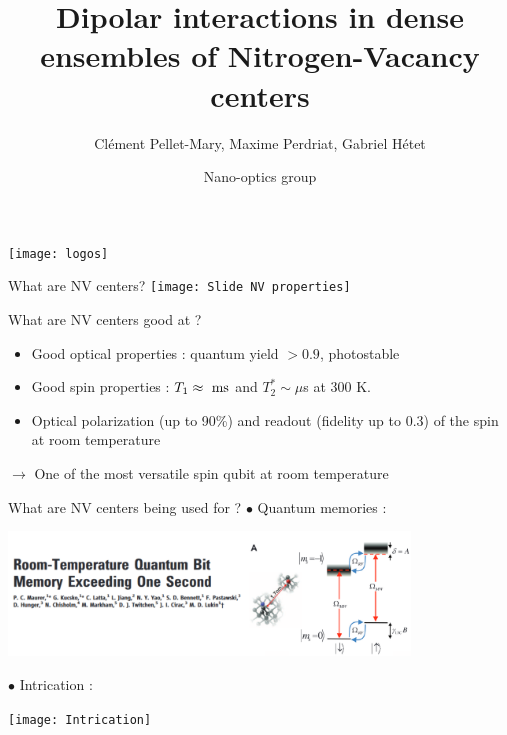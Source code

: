 \documentclass{beamer}
\title{Dipolar interactions in dense ensembles of Nitrogen-Vacancy centers}
\author{Clément Pellet-Mary, Maxime Perdriat, Gabriel Hétet}
\date{Nano-optics group}
\begin{document}
\begin{frame}
\maketitle
\begin{center}
\texttt{[image: logos]}
\end{center}
\end{frame}
\begin{frame}{What are NV centers?}
\centering
\texttt{[image: Slide  NV properties]}
\end{frame}


\begin{frame}{What are NV centers good at ?}
\begin{itemize}
\item Good optical properties : quantum yield $> 0.9$, photostable
\medskip
\item Good spin properties : $T_1\approx\ \rm ms$ and $T_2^*\sim \mu$s at 300 K.
\medskip
\item Optical polarization (up to 90\%) and readout (fidelity up to 0.3) of the spin at room temperature
\end{itemize}
\bigskip
$\to$ One of the most versatile spin qubit at room temperature
\end{frame}

\begin{frame}{What are NV centers being used for ?}
$\bullet$ Quantum memories :
\begin{center}
\includegraphics[width=0.8\textwidth,height=0.9\textheight,keepaspectratio]{mémoire}
\end{center}

$\bullet$ Intrication :
\begin{center}
\texttt{[image: Intrication]}
\end{center}
\end{frame}
\end{document}
